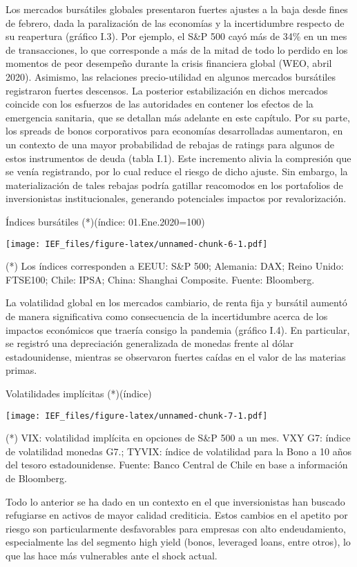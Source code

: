 \documentclass[
]{book}
\begin{document}
Los mercados bursátiles globales presentaron fuertes ajustes a la baja desde
fines de febrero, dada la paralización de las economías y la incertidumbre
respecto de su reapertura (gráfico I.3). Por ejemplo, el S\&P 500 cayó más de
34\% en un mes de transacciones, lo que corresponde a más de la mitad de todo
lo perdido en los momentos de peor desempeño durante la crisis financiera
global (WEO, abril 2020). Asimismo, las relaciones precio-utilidad en algunos
mercados bursátiles registraron fuertes descensos. La posterior estabilización
en dichos mercados coincide con los esfuerzos de las autoridades en contener
los efectos de la emergencia sanitaria, que se detallan más adelante en este
capítulo. Por su parte, los spreads de bonos corporativos para economías
desarrolladas aumentaron, en un contexto de una mayor probabilidad de
rebajas de ratings para algunos de estos instrumentos de deuda (tabla I.1). Este
incremento alivia la compresión que se venía registrando, por lo cual reduce
el riesgo de dicho ajuste. Sin embargo, la materialización de tales rebajas
podría gatillar reacomodos en los portafolios de inversionistas institucionales,
generando potenciales impactos por revalorización.

Índices bursátiles (*)(índice: 01.Ene.2020=100)

\texttt{[image: IEF\_files/figure-latex/unnamed-chunk-6-1.pdf]}

(*) Los índices corresponden a EEUU: S\&P 500; Alemania: DAX; Reino Unido: FTSE100; Chile: IPSA; China: Shanghai Composite.
Fuente: Bloomberg.

La volatilidad global en los mercados cambiario, de renta fija y bursátil
aumentó de manera significativa como consecuencia de la incertidumbre
acerca de los impactos económicos que traería consigo la pandemia (gráfico
I.4). En particular, se registró una depreciación generalizada de monedas frente
al dólar estadounidense, mientras se observaron fuertes caídas en el valor de
las materias primas.

Volatilidades implícitas (*)(índice)

\texttt{[image: IEF\_files/figure-latex/unnamed-chunk-7-1.pdf]}

(*) VIX: volatilidad implícita en opciones de S\&P 500 a un mes. VXY G7: índice de volatilidad monedas G7.; TYVIX: índice de volatilidad para la Bono a 10 años del tesoro estadounidense.
Fuente: Banco Central de Chile en base a información de Bloomberg.

Todo lo anterior se ha dado en un contexto en el que inversionistas han
buscado refugiarse en activos de mayor calidad crediticia. Estos cambios en el
apetito por riesgo son particularmente desfavorables para empresas con alto
endeudamiento, especialmente las del segmento high yield (bonos, leveraged
loans, entre otros), lo que las hace más vulnerables ante el shock actual.
\end{document}
